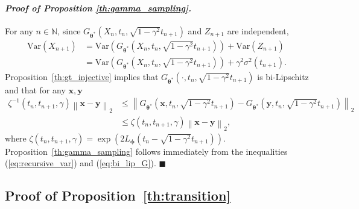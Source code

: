 \documentclass{article} \usepackage{iclr2024_coNFErence,times}
\def\eqref#1{equation~\ref{#1}}
\newcommand{\norm}[1]{\left\lVert#1\right\rVert}
\newenvironment{myproof}[2]{\paragraph{\textit{Proof of {#1} {#2}. }}}{\hfill$\blacksquare$}
\def\eqref#1{(\ref{#1})}
\def\eqref#1{(\ref{#1})}
\theoremstyle{definition}
\theoremstyle{remark}
\begin{document}
\begin{myproof}{Proposition}{\ref{th:gamma_sampling}}
For any $n\in\mathbb{N}$, since $G_{\bm{\theta}^*}(X_{n}, t_n,  \sqrt{1-\gamma^2} t_{n+1})$ and $Z_{n+1}$ are independent,
\begin{align}\label{eq:recursive_var}
    \text{Var}\left(X_{n+1}\right) 
    &= \text{Var}\left(G_{\bm{\theta}^*}(X_{n}, t_n,  \sqrt{1-\gamma^2} t_{n+1})\right) + \text{Var}\left( Z_{n+1}\right) \nonumber
    \\&= \text{Var}\left(G_{\bm{\theta}^*}(X_{n}, t_n,  \sqrt{1-\gamma^2} t_{n+1})\right) + \gamma^2\sigma^2(t_{n+1}).
\end{align}
Proposition~\ref{th:gt_injective} implies that $G_{\bm{\theta}^*}(\cdot, t_n, \sqrt{1-\gamma^2}t_{n+1})$ is bi-Lipschitz and that for any $\mathbf{x}, \mathbf{y}$
\begin{align}\label{eq:bi_lip_G}
    \zeta^{-1}(t_n, t_{n+1}, \gamma)\norm{\mathbf{x}-\mathbf{y}}_2 
    &\leq \norm{G_{\bm{\theta}^*}(\mathbf{x}, t_n, \sqrt{1-\gamma^2}t_{n+1}) - G_{\bm{\theta}^*}(\mathbf{y}, t_n, \sqrt{1-\gamma^2}t_{n+1})}_2 \nonumber
    \\&\leq \zeta(t_n, t_{n+1}, \gamma)\norm{\mathbf{x}-\mathbf{y}}_2,
\end{align}
where $\zeta(t_n, t_{n+1}, \gamma)=\exp{\left(2L_{\bm{\phi}}(t_n-\sqrt{1-\gamma^2}t_{n+1})\right)}$. Proposition~\ref{th:gamma_sampling} follows immediately from the inequalities \eqref{eq:recursive_var} and \eqref{eq:bi_lip_G}.
\end{myproof}


\subsection{Proof of Proposition~\ref{th:transition}}
\end{document}
